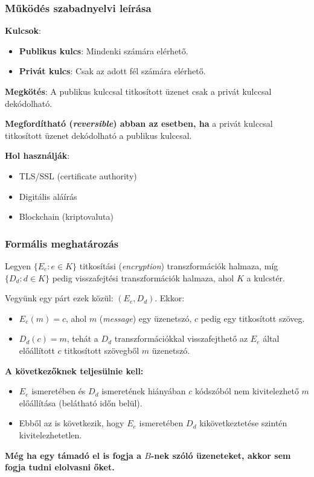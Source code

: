 \documentclass{beamer}
\begin{document}
\begin{frame}
    \frametitle{Működés szabadnyelvi leírása}

    \textbf{Kulcsok}:
    \begin{itemize}
        \item \textbf{Publikus kulcs}: Mindenki számára elérhető.
        \item \textbf{Privát kulcs}: Csak az adott fél számára elérhető.
    \end{itemize}
    \textbf{Megkötés}: A publikus kulccsal titkosított üzenet csak a privát kulccsal dekódolható.

    \textbf{Megfordítható (\textit{reversible}) abban az esetben, ha } a privát kulccsal titkosított
    üzenet dekódolható a publikus kulccsal.

    \textbf{Hol használják}:
    \begin{itemize}
        \item TLS/SSL (certificate authority)
        \item Digitális aláírás
        \item Blockchain (kriptovaluta)
    \end{itemize}
\end{frame}

\begin{frame}
    \frametitle{Formális meghatározás}

    Legyen $\{E_e: e \in K\}$ titkosítási (\textit{encryption}) transzformációk halmaza, míg $\{D_d: d \in K\}$
    pedig visszafejtési transzformációk halmaza, ahol $K$ a kulcstér.

    Vegyünk egy párt ezek közül: $(E_e, D_d)$. Ekkor:

    \begin{itemize}
        \item $E_e(m) = c$, ahol $m$ (\textit{message}) egy üzenetszó, $c$ pedig egy titkosított szöveg.
        \item $D_d(c) = m$, tehát a $D_d$ transzformációkkal visszafejthető az $E_e$ által előállított $c$ titkosított
              szövegből $m$ üzenetszó.
    \end{itemize}

    \textbf{A következőknek teljesülnie kell:}

    \begin{itemize}
        \item $E_e$ ismeretében és $D_d$ ismeretének hiányában $c$ kódszóból nem kivitelezhető $m$ előállítása (belátható
              időn belül).
        \item Ebből az is következik, hogy $E_e$ ismeretében $D_d$ kikövetkeztetése szintén kivitelezhetetlen.
    \end{itemize}

    \textbf{Még ha egy támadó el is fogja a $B$-nek szóló üzeneteket, akkor sem fogja tudni elolvasni őket.}
\end{frame}
\end{document}
